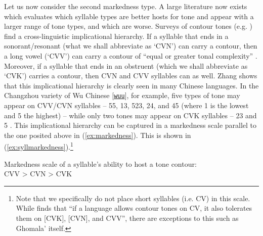 \documentclass[output=paper,colorlinks,citecolor=brown,draft,draftmode]{langscibook}
\begin{document}
Let us now consider the second markedness type. 
A large literature now exists which evaluates which syllable types are better hosts for tone and appear with a larger range of tone types, and which are worse. 
Surveys of contour tones (e.g. \cite{gordon2001,zhang2013}) find a cross-linguistic  implicational hierarchy.
If a syllable that ends in a sonorant/resonant (what we shall abbreviate as `CVN') can carry a contour, then a long vowel (`CVV') can carry a contour of ``equal or greater tonal complexity'' \citep[49]{zhang2013}. 
Moreover, if a syllable that ends in an obstruent (which we shall abbreviate as `CVK') carries a contour, then CVN and CVV syllables can as well. 
Zhang shows that this implicational hierarchy is clearly seen in many Chinese languages. 
In the Changzhou variety of Wu Chinese   
[\href{https://glottolog.org/resource/languoid/id/wuch1236}{\texttt{wuu}}], for example,  
five types of tone may appear on CVV/CVN syllables -- 55, 13, 523, 24, and 45 (where 1 is the lowest and 5 the highest) -- while only two tones may appear on CVK syllables -- 23 and 5 \citep{wang1988changzhou}.
This implicational hierarchy can be captured in a markedness scale parallel to the one posited above in (\ref{ex:markedness}).
This is shown in (\ref{ex:syllmarkedness}).\footnote{Note that we specifically do not place short syllables (i.e. CV) in this scale. While \citet[428]{gordon2001} finds  that ``if a language allows contour tones on CV, it also tolerates them on [CVK], [CVN], and CVV'', there are exceptions to this such as Ghomala' itself.}

\begin{exe}
	\ex  Markedness scale of a syllable's ability to host a tone contour:\\  \label{ex:syllmarkedness}
	CVV > CVN > CVK
\end{exe}
\end{document}
